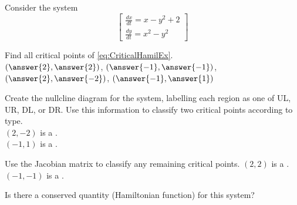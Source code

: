 \documentclass{ximera}
\begin{document}
\begin{exercise}
    Consider the system
    \begin{equation}
        \begin{bmatrix}
            \frac{dx}{dt}=x-y^2+2\\[12pt]
            \frac{dy}{dt}=x^2-y^2
        \end{bmatrix}
        \label{eq:CriticalHamilEx}
    \end{equation}
    
    Find all critical points of \eqref{eq:CriticalHamilEx}.\\
        $\left(\answer{2}, \answer{2}\right)$, $\left(\answer{-1}, \answer{-1}\right)$, $\left(\answer{2}, \answer{-2}\right)$, $\left(\answer{-1}, \answer{1}\right)$
    \begin{problem}
        Create the nullcline diagram for the system, labelling each region as one of UL, UR, DL, or DR. Use this information to classify two critical points according to type.\\
        $(2, -2)$ is a . \\
        $(-1, 1)$ is a .
        \begin{problem}
            Use the Jacobian matrix to classify any remaining critical points.
            $(2, 2)$ is a  . \\
            $(-1, -1)$ is a  .
            \begin{problem}
                Is there a conserved quantity (Hamiltonian function) for this system?
                \begin{multipleChoice}
                \end{multipleChoice}
            \end{problem}
        \end{problem}
    \end{problem}
\end{exercise}
%
\end{document}
